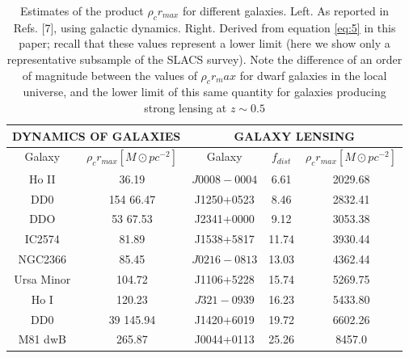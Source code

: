 \documentclass[letterpaper,10pt]{article}
\begin{document}
\begin{table*}[h]
\begin{center}
\begin{tabular}{|c|c|c|c|c|}
\hline
\multicolumn{2}{|c|}{DYNAMICS OF GALAXIES} & \multicolumn{3}{|c|}{GALAXY LENSING }  \\  \hline
Galaxy & $\rho_c r_{max}[M \odot pc^{-2}]$ & Galaxy & $f_{dist}$ & $\rho_c r_{max}[M \odot pc^{-2}]$ \\	 \hline
Ho II 			  & 	36.19  		 & $J0008-0004$  &	6.61  		& 2029.68  	\\	\hline
DD0 			  &	154 66.47   & J1250+0523 	 &  	8.46 		& 2832.41		\\	\hline
DDO		      &    53 67.53    & J2341+0000 	 & 	9.12 		& 3053.38		\\	\hline
IC2574 	  	  &  	81.89		     & J1538+5817 	 &    11.74 		& 3930.44		\\	\hline
NGC2366 	  & 	85.45       	 & $ J0216-0813$ &	13.03 		&	4362.44		\\	\hline
Ursa Minor &  104.72     	 & J1106+5228 	 & 	15.74 		& 5269.75		\\	\hline
Ho I  			  &  120.23         & $J321-0939$    &		16.23 		& 5433.80		\\	\hline
DD0 			  &  39 145.94   & J1420+6019      & 	19.72 		& 6602.26		\\	\hline
M81 dwB 	  &  265.87         & J0044+0113      &		25.26 		& 8457.0		\\	\hline
\end{tabular}
\caption{\small{Estimates of the product $\rho_cr_{max}$ for different galaxies. Left. As reported in Refs. [7], using galactic dynamics. Right. Derived from equation \eqref{eq:5} in this paper; recall that these values represent a lower limit (here we show only a representative subsample of the SLACS survey). Note the difference of an order of magnitude between the values of $\rho_cr{_max}$ for dwarf galaxies in the local universe, and the lower limit of this same quantity for galaxies producing strong lensing at $z \sim 0.5$}}
\label{Tab:1}
\end{center}
\end{table*}
\end{document}
